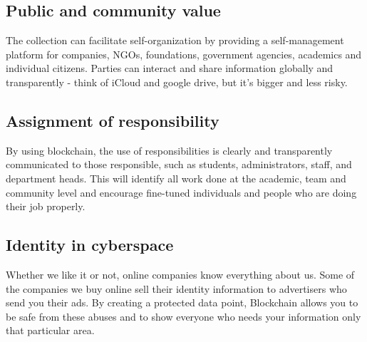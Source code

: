 \subsection{Public and community value}
The collection can facilitate self-organization by providing a self-management platform for companies, NGOs, foundations, government agencies, academics and individual citizens. Parties can interact and share information globally and transparently - think of iCloud and google drive, but it's bigger and less risky.

\subsection{Assignment of responsibility}

By using blockchain, the use of responsibilities is clearly and transparently communicated to those responsible, such as students, administrators, staff, and department heads.
This will identify all work done at the academic, team and community level and encourage fine-tuned individuals and people who are doing their job properly.

\subsection{Identity in cyberspace}
Whether we like it or not, online companies know everything about us. Some of the companies we buy online sell their identity information to advertisers who send you their ads. By creating a protected data point, Blockchain allows you to be safe from these abuses and to show everyone who needs your information only that particular area.

